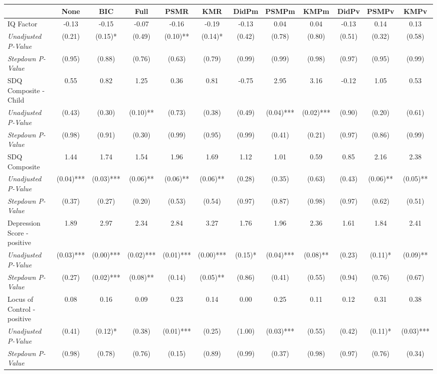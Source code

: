 \begin{tabular}{l c c c c c c c c c c c}
\toprule
 & None & BIC & Full & PSMR & KMR & DidPm & PSMPm & KMPm & DidPv & PSMPv & KMPv \\
\midrule
IQ Factor & -0.13 & -0.15 & -0.07 & -0.16 & -0.19 & -0.13 & 0.04 & 0.04 & -0.13 & 0.14 & 0.13 \\
\quad \textit{Unadjusted P-Value} & (0.21) & (0.15)* & (0.49) & (0.10)** & (0.14)* & (0.42) & (0.78) & (0.80) & (0.51) & (0.32) & (0.58) \\
\quad \textit{Stepdown P-Value} & (0.95) & (0.88) & (0.76) & (0.63) & (0.79) & (0.99) & (0.99) & (0.98) & (0.97) & (0.95) & (0.99) \\
SDQ Composite - Child & 0.55 & 0.82 & 1.25 & 0.36 & 0.81 & -0.75 & 2.95 & 3.16 & -0.12 & 1.05 & 0.53 \\
\quad \textit{Unadjusted P-Value} & (0.43) & (0.30) & (0.10)** & (0.73) & (0.38) & (0.49) & (0.04)*** & (0.02)*** & (0.90) & (0.20) & (0.61) \\
\quad \textit{Stepdown P-Value} & (0.98) & (0.91) & (0.30) & (0.99) & (0.95) & (0.99) & (0.41) & (0.21) & (0.97) & (0.86) & (0.99) \\
SDQ Composite & 1.44 & 1.74 & 1.54 & 1.96 & 1.69 & 1.12 & 1.01 & 0.59 & 0.85 & 2.16 & 2.38 \\
\quad \textit{Unadjusted P-Value} & (0.04)*** & (0.03)*** & (0.06)** & (0.06)** & (0.06)** & (0.28) & (0.35) & (0.63) & (0.43) & (0.06)** & (0.05)** \\
\quad \textit{Stepdown P-Value} & (0.37) & (0.27) & (0.20) & (0.53) & (0.54) & (0.97) & (0.87) & (0.98) & (0.97) & (0.62) & (0.51) \\
Depression Score - positive & 1.89 & 2.97 & 2.34 & 2.84 & 3.27 & 1.76 & 1.96 & 2.36 & 1.61 & 1.84 & 2.41 \\
\quad \textit{Unadjusted P-Value} & (0.03)*** & (0.00)*** & (0.02)*** & (0.01)*** & (0.00)*** & (0.15)* & (0.04)*** & (0.08)** & (0.23) & (0.11)* & (0.09)** \\
\quad \textit{Stepdown P-Value} & (0.27) & (0.02)*** & (0.08)** & (0.14) & (0.05)** & (0.86) & (0.41) & (0.55) & (0.94) & (0.76) & (0.67) \\
Locus of Control - positive & 0.08 & 0.16 & 0.09 & 0.23 & 0.14 & 0.00 & 0.25 & 0.11 & 0.12 & 0.31 & 0.38 \\
\quad \textit{Unadjusted P-Value} & (0.41) & (0.12)* & (0.38) & (0.01)*** & (0.25) & (1.00) & (0.03)*** & (0.55) & (0.42) & (0.11)* & (0.03)*** \\
\quad \textit{Stepdown P-Value} & (0.98) & (0.78) & (0.76) & (0.15) & (0.89) & (0.99) & (0.37) & (0.98) & (0.97) & (0.76) & (0.34) \\

\end{tabular}
